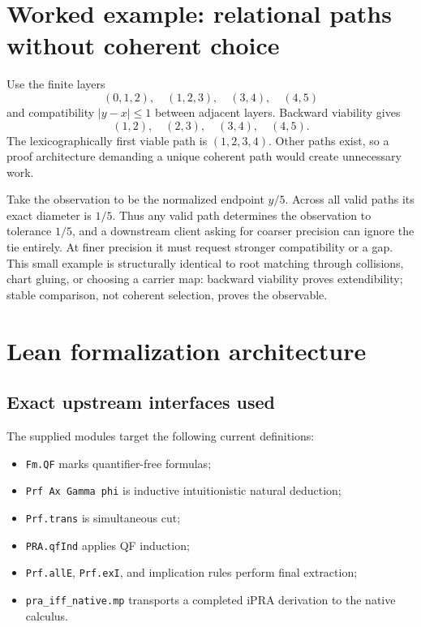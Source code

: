 \documentclass[11pt]{article}
\begin{document}
\section{Worked example: relational paths without coherent choice}

Use the finite layers
\[
  (0,1,2),\quad(1,2,3),\quad(3,4),\quad(4,5)
\]
and compatibility \(|y-x|\le1\) between adjacent layers.  Backward viability
gives
\[
  (1,2),\quad(2,3),\quad(3,4),\quad(4,5).
\]
The lexicographically first viable path is
\((1,2,3,4)\).  Other paths exist, so a proof architecture demanding a unique
coherent path would create unnecessary work.

Take the observation to be the normalized endpoint \(y/5\).  Across all valid
paths its exact diameter is \(1/5\).  Thus any valid path determines the
observation to tolerance \(1/5\), and a downstream client asking for coarser
precision can ignore the tie entirely.  At finer precision it must request
stronger compatibility or a gap.  This small example is structurally identical
to root matching through collisions, chart gluing, or choosing a carrier map:
backward viability proves extendibility; stable comparison, not coherent
selection, proves the observable.

\section{Lean formalization architecture}
\label{sec:lean}

\subsection{Exact upstream interfaces used}

The supplied modules target the following current definitions:

\begin{itemize}
\item \texttt{Fm.QF} marks quantifier-free formulas;
\item \texttt{Prf Ax Gamma phi} is inductive intuitionistic natural deduction;
\item \texttt{Prf.trans} is simultaneous cut;
\item \texttt{PRA.qfInd} applies QF induction;
\item \texttt{Prf.allE}, \texttt{Prf.exI}, and implication rules perform final
      extraction;
\item \texttt{pra\_iff\_native.mp} transports a completed iPRA derivation to
      the native calculus.
\end{itemize}
\end{document}

